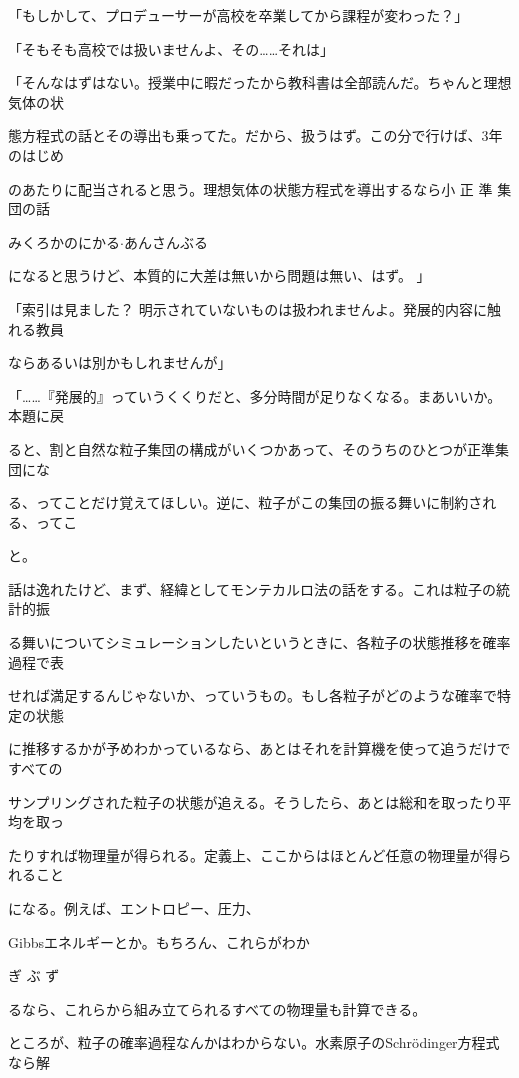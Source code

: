 「もしかして、プロデューサーが⾼校を卒業してから課程が変わった？」\par
「そもそも⾼校では扱いませんよ、その……それは」\par
「そんなはずはない。授業中に暇だったから教科書は全部読んだ。ちゃんと理想気体の状\par
態⽅程式の話とその導出も乗ってた。だから、扱うはず。この分で⾏けば、3年のはじめ\par
のあたりに配当されると思う。理想気体の状態⽅程式を導出するなら⼩ 正 準 集 団の話\par
みくろかのにかる$\cdot$あんさんぶる\par
になると思うけど、本質的に⼤差は無いから問題は無い、はず。 」\par
「索引は⾒ました？ 明⽰されていないものは扱われませんよ。発展的内容に触れる教員\par
ならあるいは別かもしれませんが」\par
「……『発展的』っていうくくりだと、多分時間が⾜りなくなる。まあいいか。本題に戻\par
ると、割と⾃然な粒⼦集団の構成がいくつかあって、そのうちのひとつが正準集団にな\par
る、ってことだけ覚えてほしい。逆に、粒⼦がこの集団の振る舞いに制約される、ってこ\par
と。\par
話は逸れたけど、まず、経緯としてモンテカルロ法の話をする。これは粒⼦の統計的振\par
る舞いについてシミュレーションしたいというときに、各粒⼦の状態推移を確率過程で表\par
せれば満⾜するんじゃないか、っていうもの。もし各粒⼦がどのような確率で特定の状態\par
に推移するかが予めわかっているなら、あとはそれを計算機を使って追うだけですべての\par
サンプリングされた粒⼦の状態が追える。そうしたら、あとは総和を取ったり平均を取っ\par
たりすれば物理量が得られる。定義上、ここからはほとんど任意の物理量が得られること\par
になる。例えば、エントロピー、圧⼒、\par
Gibbsエネルギーとか。もちろん、これらがわか\par
ぎ ぶ ず\par
るなら、これらから組み⽴てられるすべての物理量も計算できる。\par
ところが、粒⼦の確率過程なんかはわからない。⽔素原⼦のSchrödinger⽅程式なら解\par
